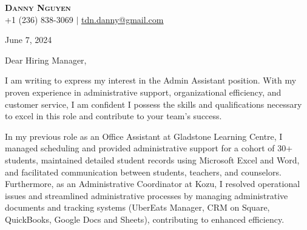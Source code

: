 \documentclass[letterpaper,11pt]{article}
\begin{document}
\begin{center}
\textbf{\Huge \scshape Danny Nguyen} \\ \vspace{1pt}
\small +1 (236) 838-3069 $|$ \href{mailto:tdn.danny@gmail.com}{\underline{tdn.danny@gmail.com}}
\end{center}

\vspace{20pt}
June 7, 2024

\vspace{20pt}

Dear Hiring Manager,
\vspace{10pt}

\vspace{10pt}
I am writing to express my interest in the Admin Assistant position. With my proven experience in administrative support, organizational efficiency, and customer service, I am confident I possess the skills and qualifications necessary to excel in this role and contribute to your team's success.

\vspace{10pt}
In my previous role as an Office Assistant at Gladstone Learning Centre, I managed scheduling and provided administrative support for a cohort of 30+ students, maintained detailed student records using Microsoft Excel and Word, and facilitated communication between students, teachers, and counselors. Furthermore, as an Administrative Coordinator at Kozu, I resolved operational issues and streamlined administrative processes by managing administrative documents and tracking systems (UberEats Manager, CRM on Square, QuickBooks, Google Docs and Sheets), contributing to enhanced efficiency.
\end{document}
